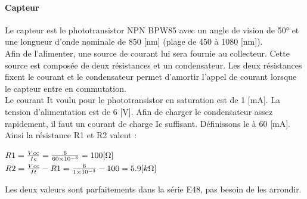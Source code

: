 \documentclass[a4paper,10pt]{article}
\begin{document}
  \paragraph{Capteur}
  Le capteur est le phototransistor NPN BPW85 avec un angle de vision de 50° et une longueur d'onde nominale de 850 [nm] (plage de 450 à 1080 [nm]). \\
  Afin de l'alimenter, une source de courant lui sera fournie au collecteur. Cette source est composée de deux résistances et un condensateur. Les deux résistances fixent le courant et le condensateur permet d'amortir l'appel de courant lorsque le capteur entre en commutation. \\
  Le courant It voulu pour le phototransistor en saturation est de 1 [mA]. La tension d'alimentation est de 6 [V]. Afin de charger le condensateur assez rapidement, il faut un courant de charge Ic suffisant. Définissons le à 60 [mA]. Ainsi la résistance R1 et R2 valent :
\begin{center}
 $ R1 = \frac{Vcc}{Ic} = \frac{6}{\num{60e-3}} = 100 [\ohm] $ \\
 $ R2 = \frac{Vcc}{It}-R1 = \frac{6}{\num{1e-3}}-100 = 5.9 [k\ohm] $
\end{center}
Les deux valeurs sont parfaitements dans la série E48, pas besoin de les arrondir.
\end{document}
